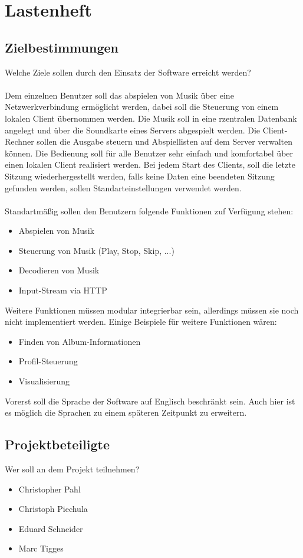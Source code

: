 \chapter{Lastenheft}
\section{Zielbestimmungen}
Welche Ziele sollen durch den Einsatz der Software erreicht werden?\ \\ \\
Dem einzelnen Benutzer soll das abspielen von Musik über eine Netzwerkverbindung ermöglicht
werden, dabei soll die Steuerung von einem lokalen Client übernommen werden. Die Musik soll
in eine rzentralen Datenbank angelegt und über die Soundkarte eines Servers abgespielt werden.
Die Client-Rechner sollen die Ausgabe steuern und Abspiellisten auf dem Server verwalten
können. Die Bedienung soll für alle Benutzer sehr einfach und komfortabel über einen lokalen
Client realisiert werden. Bei jedem Start des Clients, soll die letzte Sitzung wiederhergestellt
werden, falls keine Daten eine beendeten Sitzung gefunden werden, sollen Standarteinstellungen
verwendet werden.\ \\ \\
Standartmäßig sollen den Benutzern folgende Funktionen zuf Verfügung stehen:
\renewcommand{\labelitemi}{•}
\begin{itemize}
        \item Abspielen von Musik
        \item Steuerung von Musik (Play, Stop, Skip, ...)
        \item Decodieren von Musik
        \item Input-Stream via HTTP
\end{itemize}
Weitere Funktionen müssen modular integrierbar sein, allerdings müssen sie noch nicht implementiert
werden. Einige Beispiele für weitere Funktionen wären:
\begin{itemize}
	\item Finden von Album-Informationen
	\item Profil-Steuerung
	\item Visualisierung
\end{itemize}
Vorerst soll die Sprache der Software auf Englisch beschränkt sein. Auch hier ist es möglich die
Sprachen zu einem späteren Zeitpunkt zu erweitern.
\section{Projektbeteiligte}
Wer soll an dem Projekt teilnehmen?
\begin{itemize}
	\item Christopher Pahl
	\item Christoph Piechula
	\item Eduard Schneider
	\item Marc Tigges
\end{itemize}
